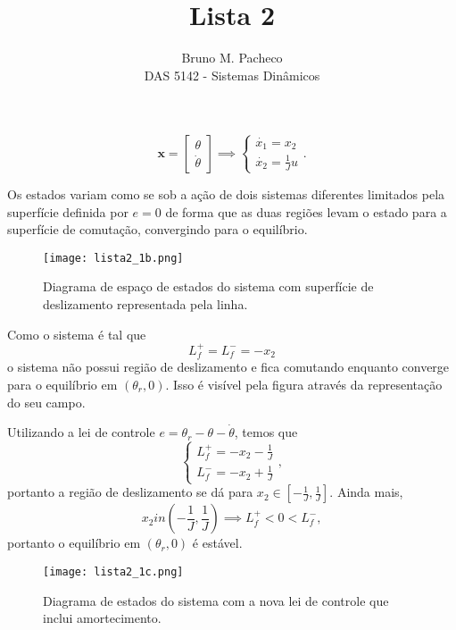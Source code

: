 \documentclass[a4paper]{report}
\begin{document}
 
\title{Lista 2}
\author{Bruno M. Pacheco\\
DAS 5142 - Sistemas Dinâmicos}
 
\maketitle
 


\[
\bm{x} = \begin{bmatrix} \theta \\ \dot{\theta} \end{bmatrix} \implies \begin{cases}
    \dot{x_1} = x_2 \\
    \dot{x_2} = \frac{1}{J}u
\end{cases}
.\] 

Os estados variam como se sob a ação de dois sistemas diferentes limitados pela superfície definida por $e = 0$ de forma que as duas regiões levam o estado para a superfície de comutação, convergindo para o equilíbrio.


\begin{figure}[H]
    \centering
    \texttt{[image: lista2\_1b.png]}
    \caption{Diagrama de espaço de estados do sistema com superfície de deslizamento representada pela linha.}
    \label{fig:lista2_1b-png}
\end{figure}

Como o sistema é tal que \[
L_f^{+} = L_f^{-} = -x_2
\] o sistema não possui região de deslizamento e fica comutando enquanto converge para o equilíbrio em $(\theta_r,0)$. Isso é visível pela figura através da representação do seu campo.


Utilizando a lei de controle $e = \theta_r - \theta - \dot{\theta}$, temos que \[
\begin{cases}
    L_f^{+} = -x_2-\frac{1}{J} \\
    L_f^{-} = -x_2 + \frac{1}{J}
\end{cases}
,\] portanto a região de deslizamento se dá para $x_2 \in \left[ -\frac{1}{J},\frac{1}{J} \right]$. Ainda mais, \[
x_2 in \left( -\frac{1}{J}, \frac{1}{J} \right) \implies L_f^{+}<0<L_f^{-}
,\] portanto o equilíbrio em $(\theta_r, 0)$ é estável.

\begin{figure}[H]
    \centering
    \texttt{[image: lista2\_1c.png]}
    \caption{Diagrama de estados do sistema com a nova lei de controle que inclui amortecimento.}
    \label{fig:lista2_1c-png}
\end{figure}
\end{document}
